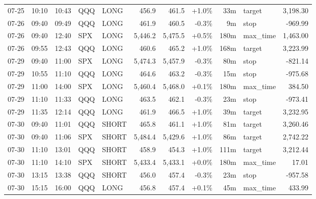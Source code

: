 \documentclass[11pt,a4paper,twoside]{article}
\begin{document}
\begin{center}
\begin{longtable}{>{\color{txtmain}}l l l l l r r r r >{\color{txtmain}}l r}
07-25 & 10:10 & 10:43 & QQQ & LONG & 456.9 & 461.5 & \textcolor{wingreen}{+1.0\%} & 33m & target & \textcolor{wingreen}{3,198.30} \\
07-26 & 09:40 & 09:49 & QQQ & LONG & 461.9 & 460.5 & \textcolor{lossred}{-0.3\%} & 9m & stop & \textcolor{lossred}{-969.99} \\
07-26 & 09:40 & 12:40 & SPX & LONG & 5,446.2 & 5,475.5 & \textcolor{wingreen}{+0.5\%} & 180m & max\_time & \textcolor{wingreen}{1,463.00} \\
07-26 & 09:55 & 12:43 & QQQ & LONG & 460.6 & 465.2 & \textcolor{wingreen}{+1.0\%} & 168m & target & \textcolor{wingreen}{3,223.99} \\
07-29 & 09:40 & 11:00 & SPX & LONG & 5,474.3 & 5,457.9 & \textcolor{lossred}{-0.3\%} & 80m & stop & \textcolor{lossred}{-821.14} \\
07-29 & 10:55 & 11:10 & QQQ & LONG & 464.6 & 463.2 & \textcolor{lossred}{-0.3\%} & 15m & stop & \textcolor{lossred}{-975.68} \\
07-29 & 11:00 & 14:00 & SPX & LONG & 5,460.4 & 5,468.0 & \textcolor{wingreen}{+0.1\%} & 180m & max\_time & \textcolor{wingreen}{384.50} \\
07-29 & 11:10 & 11:33 & QQQ & LONG & 463.5 & 462.1 & \textcolor{lossred}{-0.3\%} & 23m & stop & \textcolor{lossred}{-973.41} \\
07-29 & 11:35 & 12:14 & QQQ & LONG & 461.9 & 466.5 & \textcolor{wingreen}{+1.0\%} & 39m & target & \textcolor{wingreen}{3,232.95} \\
07-30 & 09:40 & 11:01 & QQQ & SHORT & 465.8 & 461.1 & \textcolor{wingreen}{+1.0\%} & 81m & target & \textcolor{wingreen}{3,260.46} \\
07-30 & 09:40 & 11:06 & SPX & SHORT & 5,484.4 & 5,429.6 & \textcolor{wingreen}{+1.0\%} & 86m & target & \textcolor{wingreen}{2,742.22} \\
07-30 & 11:10 & 13:01 & QQQ & SHORT & 458.9 & 454.3 & \textcolor{wingreen}{+1.0\%} & 111m & target & \textcolor{wingreen}{3,212.44} \\
07-30 & 11:10 & 14:10 & SPX & SHORT & 5,433.4 & 5,433.1 & \textcolor{wingreen}{+0.0\%} & 180m & max\_time & \textcolor{wingreen}{17.01} \\
07-30 & 13:15 & 13:38 & QQQ & SHORT & 456.0 & 457.4 & \textcolor{lossred}{-0.3\%} & 23m & stop & \textcolor{lossred}{-957.58} \\
07-30 & 15:15 & 16:00 & QQQ & LONG & 456.8 & 457.4 & \textcolor{wingreen}{+0.1\%} & 45m & max\_time & \textcolor{wingreen}{433.99} \\

\end{longtable}
\end{center}
\end{document}
